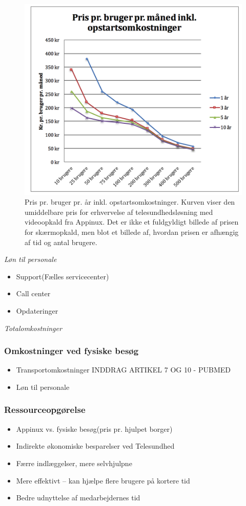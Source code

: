 \begin{figure}[H]
	\centering
	\includegraphics[width=1\textwidth]{Figurer/Snip20160504_28}
	\caption{Pris pr. bruger pr. år inkl. opstartsomkostninger.  Kurven viser den umiddelbare pris for erhvervelse af telesundhedsløsning med videoopkald fra Appinux. Det er ikke et fuldgyldigt billede af prisen for skærmopkald, men blot et billede af, hvordan prisen er afhængig af tid og antal brugere.}
\end{figure}

\textit{Løn til personale}
\begin{itemize}
	\item Support(Fælles servicecenter)
	\item Call center
	\item Opdateringer
\end{itemize}

\textit{Totalomkostninger}

\subsubsection{Omkostninger ved fysiske besøg}
\begin{itemize}
	\item Transportomkostninger INDDRAG ARTIKEL 7 OG 10 - PUBMED
	\item Løn til personale
\end{itemize}

\subsubsection{Ressourceopgørelse}
\begin{itemize}
	\item Appinux vs. fysiske besøg(pris pr. hjulpet borger)
	\item Indirekte økonomiske besparelser ved Telesundhed
	\item Færre indlæggelser, mere selvhjulpne
	\item Mere effektivt – kan hjælpe flere brugere på kortere tid
	\item Bedre udnyttelse af medarbejdernes tid
\end{itemize}

